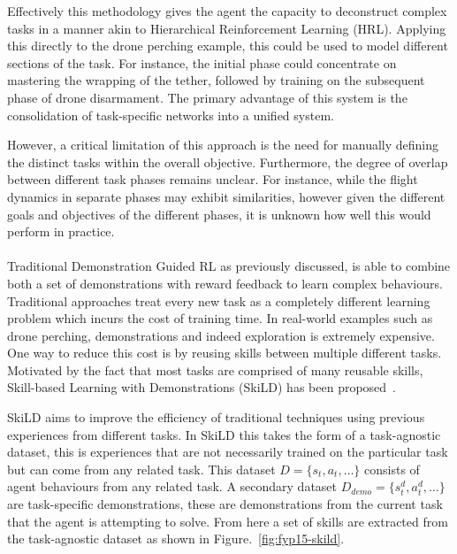 Effectively this methodology gives the agent the capacity to deconstruct complex tasks in a manner akin to Hierarchical Reinforcement Learning (HRL). 
Applying this directly to the drone perching example, this could be used to model different sections of the task.
For instance, the initial phase could concentrate on mastering the wrapping of the tether, followed by training on the subsequent phase of drone disarmament. 
The primary advantage of this system is the consolidation of task-specific networks into a unified system.

However, a critical limitation of this approach is the need for manually defining the distinct tasks within the overall objective. 
Furthermore, the degree of overlap between different task phases remains unclear. 
For instance, while the flight dynamics in separate phases may exhibit similarities, however given the different goals and objectives of the different phases, it is unknown how well this would perform in practice. \\\\


Traditional Demonstration Guided RL as previously discussed, is able to combine both a set of demonstrations with reward feedback to learn complex behaviours.
Traditional approaches treat every new task as a completely different learning problem which incurs the cost of training time.
In real-world examples such as drone perching, demonstrations and indeed exploration is extremely expensive.
One way to reduce this cost is by reusing skills between multiple different tasks.
Motivated by the fact that most tasks are comprised of many reusable skills, Skill-based Learning with Demonstrations (SkiLD) has been proposed~\cite{fyp15-demo-guided-rl-with-skills}.

SkiLD aims to improve the efficiency of traditional techniques using previous experiences from different tasks.
In SkiLD this takes the form of a task-agnostic dataset, this is experiences that are not necessarily trained on the particular task but can come from any related task.
This dataset $D = \{s_t, a_t, \dots\}$ consists of agent behaviours from any related task.
A secondary dataset $D_{demo} = \{s_{t}^{d}, a_{t}^{d}, \dots\}$ are task-specific demonstrations, these are demonstrations from the current task that the agent is attempting to solve.
From here a set of skills are extracted from the task-agnostic dataset as shown in Figure.~\ref{fig:fyp15-skild}.

